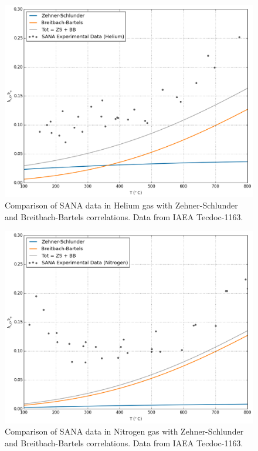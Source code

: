 \begin{figure}[!h]
    \centering
    \includegraphics[width=\singleimagewidth]{figures/keff-sana-he}
    \caption{Comparison of SANA data in Helium gas with Zehner-Schlunder and Breitbach-Bartels correlations. Data from IAEA Tecdoc-1163\cite{Report2000}.}
    \label{fig:keff-sana-he}
\end{figure}
\begin{figure}[!h]
    \centering
    \includegraphics[width=\singleimagewidth]{figures/keff-sana-n}
    \caption{Comparison of SANA data in Nitrogen gas with Zehner-Schlunder and Breitbach-Bartels correlations. Data from IAEA Tecdoc-1163\cite{Report2000}.}
    \label{fig:keff-sana-n}
\end{figure}

